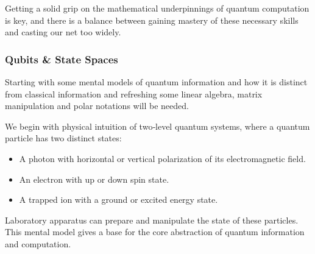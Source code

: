 Getting a solid grip on the mathematical underpinnings of quantum computation is key, 
and there is a balance between gaining mastery of these necessary skills and casting our net too widely.


\subsubsection{Qubits \& State Spaces}

Starting with some mental models of quantum information and how it is distinct from classical information
and refreshing some linear algebra, matrix manipulation and polar notations will be needed.  

We begin with physical intuition of two‑level quantum systems, where a quantum particle has two distinct states:
\begin{itemize}
	\item A photon with horizontal or vertical polarization of its electromagnetic field.
	\item An electron with up or down spin state.
	\item A trapped ion with a ground or excited energy state.
\end{itemize}

Laboratory apparatus can prepare and manipulate  the state of these particles.
This mental model gives a base for the core abstraction of quantum information and computation.

